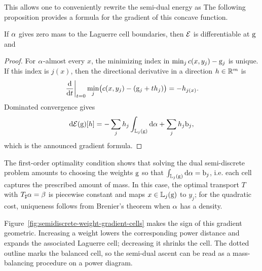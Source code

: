 This allows one to conveniently rewrite the semi-dual energy as
The following proposition provides a formula for the gradient of this concave function.

\begin{prop}
If $\alpha$ gives zero mass to the Laguerre cell boundaries, then $\mathcal{E}$ is differentiable at $\mathrm{g}$ and
\end{prop}
\begin{proof}
	For $\alpha$-almost every $x$, the minimizing index in $\min_j c(x,y_j)-\mathrm{g}_j$ is unique. If this index is $j(x)$, then the directional derivative in a direction $h\in\mathbb{R}^m$ is
	\[
		\left.\frac{\mathrm{d}}{\mathrm{d} t}\right|_{t=0}
		\min_j \bigl(c(x,y_j)-(\mathrm{g}_j+t h_j)\bigr)
		=
		-h_{j(x)}.
	\]
	Dominated convergence gives
	\[
		\mathrm{d}\mathcal{E}(\mathrm{g})[h]
		=
		-\sum_j h_j\int_{\mathbb{L}_j(\mathrm{g})}\mathrm{d}\alpha
		+\sum_j h_j\mathrm{b}_j,
	\]
	which is the announced gradient formula.
\end{proof}

The first-order optimality condition shows that solving the dual semi-discrete problem amounts to choosing the weights $\mathrm{g}$ so that $\int_{\mathbb{L}_{j}(\mathrm{g})} \mathrm{d}\alpha = \mathrm{b}_j$, i.e. each cell captures the prescribed amount of mass. In this case, the optimal transport $T$ with $T_\sharp \alpha=\beta$ is piecewise constant and maps $x \in \mathbb{L}_{j}(\mathrm{g})$ to $y_j$; for the quadratic cost, uniqueness follows from Brenier's theorem when $\alpha$ has a density.


Figure~\ref{fig:semidiscrete-weight-gradient-cells} makes the sign of this gradient geometric. Increasing a weight lowers the corresponding power distance and expands the associated Laguerre cell; decreasing it shrinks the cell. The dotted outline marks the balanced cell, so the semi-dual ascent can be read as a mass-balancing procedure on a power diagram.

